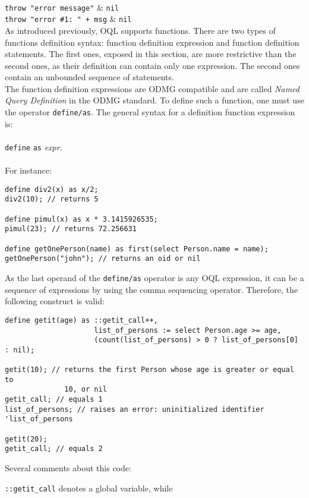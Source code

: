 \hline
\etab
\bettab
{}
\\
\hline \texttt{throw "error message"} & \texttt{nil}\\
\hline \texttt{throw "error \#1: " + msg} &
\texttt{nil}\\
\hline
\etab
{}
\label{fundefexp}
As introduced previously, OQL supports functions. There are two types of
functions definition syntax:
function definition expression and function definition statements.
The first ones, exposed in this section, are more restrictive than the
second ones, as their definition can contain only one expression.
The second ones contain an unbounded sequence of statements.
\\
The function definition expressions are ODMG compatible and are called
\emph{Named Query Definition} in the ODMG standard.
To define such a function, one must use the operator \texttt{define/as}.
The general syntax for a definition function expression is:\\\\
\texttt{define}  \texttt{as} \emph{expr}.
\\\\
For instance:
\begin{verbatim}
define div2(x) as x/2;
div2(10); // returns 5

define pimul(x) as x * 3.1415926535;
pimul(23); // returns 72.256631

define getOnePerson(name) as first(select Person.name = name);
getOnePerson("john"); // returns an oid or nil
\end{verbatim}
As the last operand of the \texttt{define/as} operator is any OQL
expression, it can be a sequence of expressions by using the
comma sequencing operator. Therefore, the following construct is valid:
\begin{verbatim}
define getit(age) as ::getit_call++,
                     list_of_persons := select Person.age >= age,
                     (count(list_of_persons) > 0 ? list_of_persons[0] : nil);

getit(10); // returns the first Person whose age is greater or equal to
              10, or nil
getit_call; // equals 1
list_of_persons; // raises an error: uninitialized identifier 'list_of_persons

getit(20);
getit_call; // equals 2
\end{verbatim}
Several comments about this code:
\be
\item \texttt{::getit\_call} denotes a global variable, while
